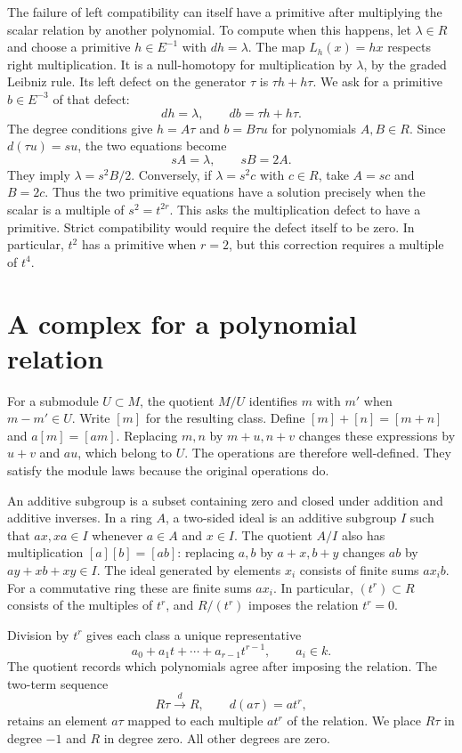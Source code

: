 The failure of left compatibility can itself have a primitive after
multiplying the scalar relation by another polynomial.
To compute when this happens, let $\lambda\in R$ and choose a
primitive $h\in E^{-1}$ with $dh=\lambda$.
The map $L_h(x)=hx$ respects right multiplication.
It is a null-homotopy for multiplication by $\lambda$, by the graded
Leibniz rule.
Its left defect on the generator $\tau$ is $\tau h+h\tau$.
We ask for a primitive $b\in E^{-3}$ of that defect:
\[
 dh=\lambda,\qquad db=\tau h+h\tau.
\]
The degree conditions give $h=A\tau$ and $b=B\tau u$ for
polynomials $A,B\in R$.
Since $d(\tau u)=su$, the two equations become
\[
 sA=\lambda,\qquad sB=2A.
\]
They imply $\lambda=s^2B/2$.
Conversely, if $\lambda=s^2c$ with $c\in R$, take
$A=sc$ and $B=2c$.
Thus the two primitive equations have a solution precisely when the
scalar is a multiple of $s^2=t^{2r}$.
This asks the multiplication defect to have a primitive.
Strict compatibility would require the defect itself to be zero.
In particular, $t^2$ has a primitive when $r=2$, but this correction
requires a multiple of $t^4$.

\section{A complex for a polynomial relation}
\label{sec:rel-complexes}

For a submodule $U\subset M$, the quotient $M/U$ identifies $m$ with $m'$
when $m-m'\in U$. Write $[m]$ for the resulting class.
Define $[m]+[n]=[m+n]$ and $a[m]=[am]$.
Replacing $m,n$ by $m+u,n+v$ changes these expressions by $u+v$ and $au$,
which belong to $U$. The operations are therefore well-defined.
They satisfy the module laws because the original operations do.

An additive subgroup is a subset containing zero and closed under
addition and additive inverses.
In a ring $A$, a two-sided ideal is an additive subgroup $I$ such that
$ax,xa\in I$ whenever $a\in A$ and $x\in I$.
The quotient $A/I$ also has multiplication $[a][b]=[ab]$:
replacing $a,b$ by $a+x,b+y$ changes $ab$ by $ay+xb+xy\in I$.
The ideal generated by elements $x_i$ consists of finite sums $a x_i b$.
For a commutative ring these are finite sums $a x_i$.
In particular, $(t^r)\subset R$ consists of the multiples of $t^r$,
and $R/(t^r)$ imposes the relation $t^r=0$.

Division by $t^r$ gives each class a unique representative
\[
 a_0+a_1t+\cdots+a_{r-1}t^{r-1},\qquad a_i\in k.
\]
The quotient records which polynomials agree after imposing the relation.
The two-term sequence
\[
 R\tau\xrightarrow{\ d\ }R,
 \qquad d(a\tau)=at^r,
\]
retains an element $a\tau$ mapped to each multiple $at^r$ of the relation.
We place $R\tau$ in degree $-1$ and $R$ in degree zero.
All other degrees are zero.

